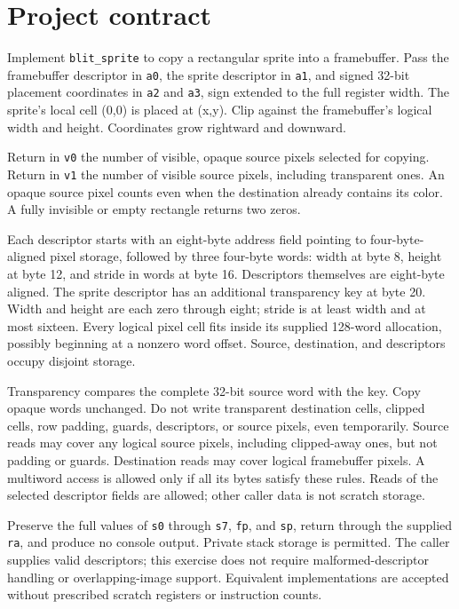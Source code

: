 \section*{Project contract}
Implement \texttt{blit\_sprite} to copy a rectangular sprite into a framebuffer. Pass the framebuffer descriptor in \texttt{a0}, the sprite descriptor in \texttt{a1}, and signed 32-bit placement coordinates in \texttt{a2} and \texttt{a3}, sign extended to the full register width. The sprite's local cell (0,0) is placed at (x,y). Clip against the framebuffer's logical width and height. Coordinates grow rightward and downward.

Return in \texttt{v0} the number of visible, opaque source pixels selected for copying. Return in \texttt{v1} the number of visible source pixels, including transparent ones. An opaque source pixel counts even when the destination already contains its color. A fully invisible or empty rectangle returns two zeros.

Each descriptor starts with an eight-byte address field pointing to four-byte-aligned pixel storage, followed by three four-byte words: width at byte 8, height at byte 12, and stride in words at byte 16. Descriptors themselves are eight-byte aligned. The sprite descriptor has an additional transparency key at byte 20. Width and height are each zero through eight; stride is at least width and at most sixteen. Every logical pixel cell fits inside its supplied 128-word allocation, possibly beginning at a nonzero word offset. Source, destination, and descriptors occupy disjoint storage.

Transparency compares the complete 32-bit source word with the key. Copy opaque words unchanged. Do not write transparent destination cells, clipped cells, row padding, guards, descriptors, or source pixels, even temporarily. Source reads may cover any logical source pixels, including clipped-away ones, but not padding or guards. Destination reads may cover logical framebuffer pixels. A multiword access is allowed only if all its bytes satisfy these rules. Reads of the selected descriptor fields are allowed; other caller data is not scratch storage.

Preserve the full values of \texttt{s0} through \texttt{s7}, \texttt{fp}, and \texttt{sp}, return through the supplied \texttt{ra}, and produce no console output. Private stack storage is permitted. The caller supplies valid descriptors; this exercise does not require malformed-descriptor handling or overlapping-image support. Equivalent implementations are accepted without prescribed scratch registers or instruction counts.
